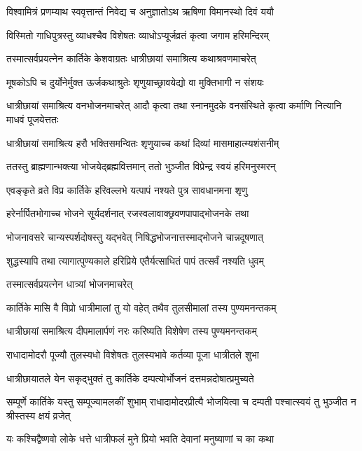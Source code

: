 \twolineshloka
{विश्वामित्रं प्रणम्याथ स्ववृत्तान्तं निवेद्य च}
{अनुज्ञातोऽथ ऋषिणा विमानस्थो दिवं ययौ} %

\twolineshloka
{विस्मितो गाधिपुत्रस्तु व्याधश्चैव विशेषतः}
{व्याधोऽप्यूर्जव्रतं कृत्वा जगाम हरिमन्दिरम्} %

\twolineshloka
{तस्मात्सर्वप्रयत्नेन कार्तिके केशवाग्रतः}
{धात्रीछायां समाश्रित्य कथाश्रवणमाचरेत्} %

\twolineshloka
{मूषकोऽपि च दुर्योनेर्मुक्त ऊर्जकथाश्रुतेः}
{शृणुयाच्छ्रावयेद्यो वा मुक्तिभागी न संशयः} %

\threelineshloka
{धात्रीछायां समाश्रित्य वनभोजनमाचरेत्}
{आदौ कृत्वा तथा स्नानमुदके वनसंस्थिते}
{कृत्वा कर्माणि नित्यानि माधवं पूजयेत्ततः} %

\twolineshloka
{धात्रीछायां समाश्रित्य हरौ भक्तिसमन्वितः}
{शृणुयाच्च कथां दिव्यां मासमाहात्म्यशंसनीम्} %

\twolineshloka
{ततस्तु ब्राह्मणान्भक्त्या भोजयेद्ब्रह्मवित्तमान्}
{ततो भुञ्जीत विप्रेन्द्र स्वयं हरिमनुस्मरन्} %

\twolineshloka
{एवङ्कृते व्रते विप्र कार्तिके हरिवल्लभे}
{यत्पापं नश्यते पुत्र सावधानमना शृणु} %

\twolineshloka
{हरेर्नार्पितभोगाच्च भोजने सूर्यदर्शनात्}
{रजस्वलावाक्छ्रवणपापाद्भोजनके तथा} %

\twolineshloka
{भोजनावसरे चान्यस्पर्शदोषस्तु यद्भवेत्}
{निषिद्धभोजनात्तस्माद्भोजने चान्नदूषणात्} %

\twolineshloka
{शुद्धस्यापि तथा त्यागात्पुण्यकाले हरिप्रिये}
{एतैर्यत्साधितं पापं तत्सर्वं नश्यति धुवम्} %


\onelineshloka
{तस्मात्सर्वप्रयत्नेन धात्र्यां भोजनमाचरेत्} %

\twolineshloka
{कार्तिके मासि वै विप्रो धात्रीमालां तु यो वहेत्}
{तथैव तुलसीमालां तस्य पुण्यमनन्तकम्} %

\twolineshloka
{धात्रीछायां समाश्रित्य दीपमालार्पणं नरः}
{करिष्यति विशेषेण तस्य पुण्यमनन्तकम्} %

\twolineshloka
{राधादामोदरौ पूज्यौ तुलस्यधो विशेषतः}
{तुलस्यभावे कर्तव्या पूजा धात्रीतले शुभा} %

\twolineshloka
{धात्रीछायातले येन सकृद्भुक्तं तु कार्तिके}
{दम्पत्योर्भोजनं दत्तमन्नदोषात्प्रमुच्यते} %

\threelineshloka
{सम्पूर्णे कार्तिके यस्तु सम्पूज्यामलकीं शुभाम्}
{राधादामोदरप्रीत्यै भोजयित्वा च दम्पती}
{पश्चात्स्वयं तु भुञ्जीत न श्रीस्तस्य क्षयं व्रजेत्} %

\twolineshloka
{यः कश्चिद्वैष्णवो लोके धत्ते धात्रीफलं मुने}
{प्रियो भवति देवानां मनुष्याणां च का कथा} %

